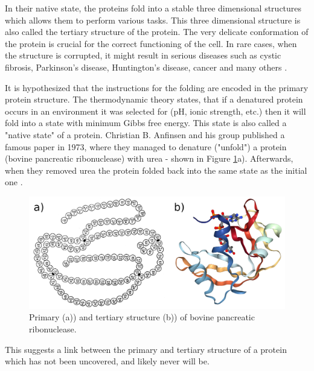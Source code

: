 
In their native state, the proteins fold into a stable three dimensional structures which allows them to perform various tasks.
This three dimensional structure is also called the tertiary structure of the protein.
The very delicate conformation of the protein is crucial for the correct functioning of the cell.
In rare cases, when the structure is corrupted, it might result in serious diseases such as cystic fibrosis, Parkinson's disease, Huntington's disease, cancer and many others \cite{protein_misfolding_diseases}.

It is hypothesized that the instructions for the folding are encoded in the primary protein structure. 
The thermodynamic theory states, that if a denatured protein occurs in an environment it was selected for (pH, ionic strength, etc.) then it will fold into a state with minimum Gibbs free energy.
This state is also called a "native state" of a protein. 
Christian B. Anfinsen and his group published a famous paper in 1973, where they managed to denature ("unfold") a protein (bovine pancreatic ribonuclease) with urea - shown in Figure \ref{fig:primarytertiary}a). 
Afterwards, when they removed urea the protein folded back into the same state as the initial one \cite{anfinsen}.
    
\begin{figure}[b!]
    \centering
    \includegraphics[scale = 0.25]{imgs_tomas/primary_tertiary.png}
    \caption{Primary (a)) \cite{anfinsen} and tertiary structure (b)) \cite{pdb} of bovine pancreatic ribonuclease.}
    \label{fig:primarytertiary}
\end{figure}
    
This suggests a link between the primary and tertiary structure of a protein which has not been uncovered, and likely never will be. %
    
